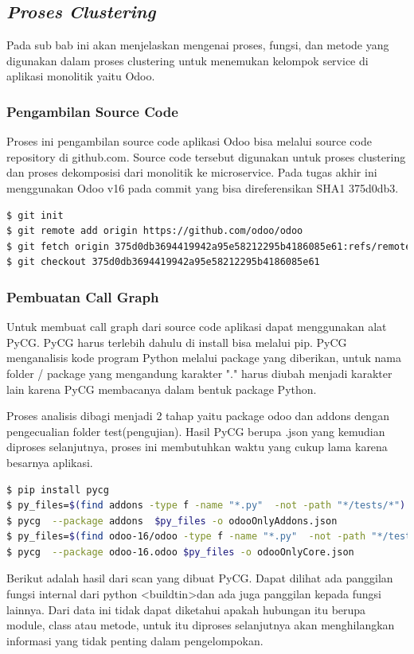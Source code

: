 \subsection{\textit{Proses Clustering}}
Pada sub bab ini akan menjelaskan mengenai proses, fungsi, dan metode yang digunakan dalam proses clustering untuk menemukan kelompok service di aplikasi monolitik yaitu Odoo. \\

\subsubsection{Pengambilan Source Code}
Proses ini pengambilan source code aplikasi Odoo bisa melalui source code repository di github.com. Source code tersebut digunakan untuk proses clustering dan proses dekomposisi dari monolitik ke microservice. Pada tugas akhir ini menggunakan Odoo v16 pada commit yang bisa direferensikan SHA1 375d0db3. 
\begin{lstlisting}[style=mystyle, language=sh, caption={Shell Script Git untuk pengambilan source code}]
$ git init
$ git remote add origin https://github.com/odoo/odoo
$ git fetch origin 375d0db3694419942a95e58212295b4186085e61:refs/remotes/origin/16.0 --depth=1
$ git checkout 375d0db3694419942a95e58212295b4186085e61
\end{lstlisting} 

\subsubsection{Pembuatan Call Graph}
Untuk membuat call graph dari source code aplikasi dapat menggunakan alat PyCG. PyCG harus terlebih dahulu di install bisa melalui pip. PyCG menganalisis kode program Python melalui package yang diberikan, untuk nama folder / package yang mengandung karakter "." harus diubah menjadi karakter lain karena PyCG membacanya dalam bentuk package Python. 

Proses analisis dibagi menjadi 2 tahap yaitu package odoo dan addons dengan pengecualian folder test(pengujian). Hasil PyCG berupa .json yang kemudian diproses selanjutnya, proses ini membutuhkan waktu yang cukup lama karena besarnya aplikasi.
\begin{lstlisting}[style=mystyle, language=sh, caption={Shell Script untuk pembuatan call graph}]
$ pip install pycg
$ py_files=$(find addons -type f -name "*.py"  -not -path "*/tests/*")
$ pycg  --package addons  $py_files -o odooOnlyAddons.json
$ py_files=$(find odoo-16/odoo -type f -name "*.py"  -not -path "*/tests/*")
$ pycg  --package odoo-16.odoo $py_files -o odooOnlyCore.json
\end{lstlisting}
Berikut adalah hasil dari scan yang dibuat PyCG. Dapat dilihat ada panggilan fungsi internal dari python  \textless buildtin\textgreater dan ada juga panggilan kepada fungsi lainnya. Dari data ini tidak dapat diketahui apakah hubungan itu berupa module, class atau metode, untuk itu diproses selanjutnya akan menghilangkan informasi yang tidak penting dalam pengelompokan.

